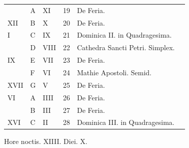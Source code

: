 \begin{center}
\begin{tabular}{l | l | l | r | l l}
\color{Red}  & \color{Red} A & \color{Red} XI & 19 & De Feria. & \color{Red} \\
\color{Red} XII & B & \color{Red} X & 20 & De Feria. & \color{Red} \\
\color{Red} I & C & \color{Red} IX & 21 & \color{Red} Dominica II. in Quadragesima. \\
\color{Red}  & D & \color{Red} VIII & 22 & \color{Red} Cathedra Sancti Petri. Simplex. \\
\color{Red} IX & E & \color{Red} VII & 23 & De Feria. & \color{Red} \\
\color{Red}  & F & \color{Red} VI & 24 & Mathie Apostoli. Semid. \\
\color{Red} XVII & G & \color{Red} V & 25 & De Feria. & \color{Red} \\
\color{Red} VI & \color{Red} A & \color{Red} IIII & 26 & De Feria. & \color{Red} \\
\color{Red}  & B & \color{Red} III & 27 & De Feria. & \color{Red} \\
\color{Red} XVI & C & \color{Red} II & 28 & \color{Red} Dominica III. in Quadragesima. \\
\end{tabular}
\newline \color{Red} Hore noctis. XIIII. Diei. X.
\end{center}



\newpage
\color{Red}\color{black}

